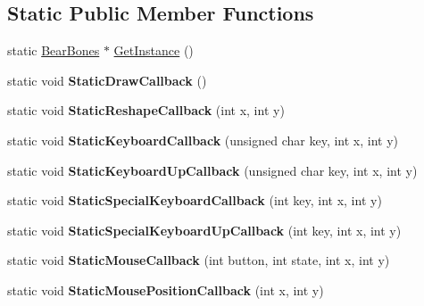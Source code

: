\subsection*{Static Public Member Functions}
\begin{DoxyCompactItemize}
\item 
static \hyperlink{class_core_1_1_bear_bones}{Bear\+Bones} $\ast$ \hyperlink{class_core_1_1_bear_bones_acd30744bc23c254b1c211b3370c5285b}{Get\+Instance} ()
\item 
\mbox{\label{class_core_1_1_bear_bones_a5a1ebfac1f03eb109d16f6eb5323aa7b}} 
static void {\bfseries Static\+Draw\+Callback} ()
\item 
\mbox{\label{class_core_1_1_bear_bones_a9f614a631570c27302b547f8e455b490}} 
static void {\bfseries Static\+Reshape\+Callback} (int x, int y)
\item 
\mbox{\label{class_core_1_1_bear_bones_a2f3124566f319322c8ed018ef26d70cf}} 
static void {\bfseries Static\+Keyboard\+Callback} (unsigned char key, int x, int y)
\item 
\mbox{\label{class_core_1_1_bear_bones_ada1a138721b6c52340048737a7da47ff}} 
static void {\bfseries Static\+Keyboard\+Up\+Callback} (unsigned char key, int x, int y)
\item 
\mbox{\label{class_core_1_1_bear_bones_a57181e3fdb45a9a76a52c0880e097aff}} 
static void {\bfseries Static\+Special\+Keyboard\+Callback} (int key, int x, int y)
\item 
\mbox{\label{class_core_1_1_bear_bones_a024876e1246d99395cecc70c7217a4a5}} 
static void {\bfseries Static\+Special\+Keyboard\+Up\+Callback} (int key, int x, int y)
\item 
\mbox{\label{class_core_1_1_bear_bones_a434c29a5fc3f34cf83f81403ea9699c7}} 
static void {\bfseries Static\+Mouse\+Callback} (int button, int state, int x, int y)
\item 
\mbox{\label{class_core_1_1_bear_bones_a1881e977aae064d71ef78ad8cdef6df8}} 
static void {\bfseries Static\+Mouse\+Position\+Callback} (int x, int y)

\end{DoxyCompactItemize}
